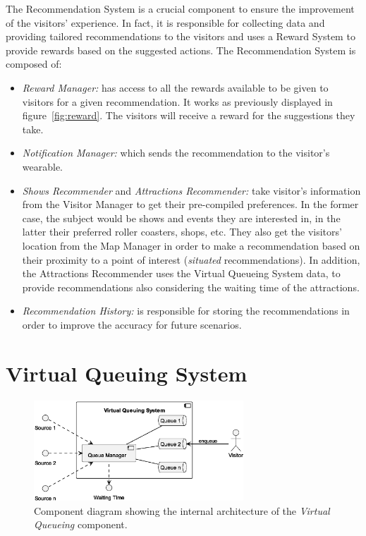 The Recommendation System is a crucial component to ensure the improvement of the visitors' experience. In fact, it is responsible for collecting
data and providing tailored recommendations to the visitors and uses a Reward System to provide rewards based on the suggested actions. The Recommendation System is composed of:
\begin{itemize}
	\item \textit{Reward Manager:} has access to all the rewards available to be given to visitors for a given recommendation. It works as previously displayed in figure~\ref{fig:reward}.
	      The visitors will receive a reward for the suggestions they take.
	\item \textit{Notification Manager:} which sends the recommendation to the visitor's wearable.
	\item \textit{Shows Recommender} and \textit{Attractions Recommender:} take visitor's information from the Visitor Manager to get their pre-compiled preferences.
	      In the former case, the subject would be shows and events they are interested in, in the latter their preferred roller coasters, shops, etc. They also get the visitors' location from the Map Manager in order to make a recommendation based on their proximity to a point of interest (\textit{situated} recommendations).
	      In addition, the Attractions Recommender uses the Virtual Queueing System data, to provide recommendations also considering the waiting time of the attractions.
	\item \textit{Recommendation History:} is responsible for storing the recommendations in order to improve the accuracy for future scenarios.
\end{itemize}

\section{Virtual Queuing System}
\begin{figure}[H]
	\centering
	\includegraphics[width=0.7\textwidth]{img/virtual-queuing.eps}
	\caption{Component diagram showing the internal architecture of the \textit{Virtual Queueing} component.
	}
	\label{fig:virtual-queueing-arch}
\end{figure}

